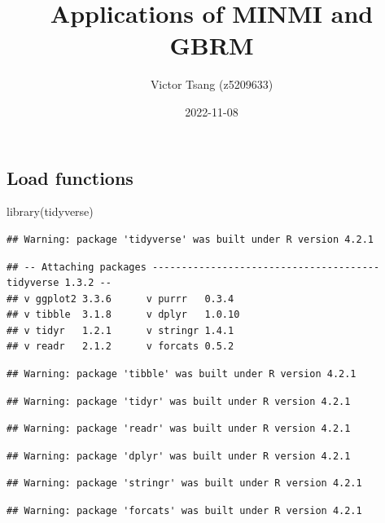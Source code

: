 \documentclass[
]{article}
\title{Applications of MINMI and GBRM}
\author{Victor Tsang (z5209633)}
\date{2022-11-08}
\newenvironment{Shaded}{\begin{snugshade}}{\end{snugshade}}
\newcommand{\FunctionTok}[1]{\textcolor[rgb]{0.00,0.00,0.00}{#1}}
\newcommand{\NormalTok}[1]{#1}
\begin{document}
\maketitle

\hypertarget{load-functions}{%
\subsection{Load functions}\label{load-functions}}

\begin{Shaded}
\begin{Highlighting}[]
\FunctionTok{library}\NormalTok{(tidyverse)}
\end{Highlighting}
\end{Shaded}

\begin{verbatim}
## Warning: package 'tidyverse' was built under R version 4.2.1
\end{verbatim}

\begin{verbatim}
## -- Attaching packages --------------------------------------- tidyverse 1.3.2 --
## v ggplot2 3.3.6      v purrr   0.3.4 
## v tibble  3.1.8      v dplyr   1.0.10
## v tidyr   1.2.1      v stringr 1.4.1 
## v readr   2.1.2      v forcats 0.5.2
\end{verbatim}

\begin{verbatim}
## Warning: package 'tibble' was built under R version 4.2.1
\end{verbatim}

\begin{verbatim}
## Warning: package 'tidyr' was built under R version 4.2.1
\end{verbatim}

\begin{verbatim}
## Warning: package 'readr' was built under R version 4.2.1
\end{verbatim}

\begin{verbatim}
## Warning: package 'dplyr' was built under R version 4.2.1
\end{verbatim}

\begin{verbatim}
## Warning: package 'stringr' was built under R version 4.2.1
\end{verbatim}

\begin{verbatim}
## Warning: package 'forcats' was built under R version 4.2.1
\end{verbatim}
\end{document}
